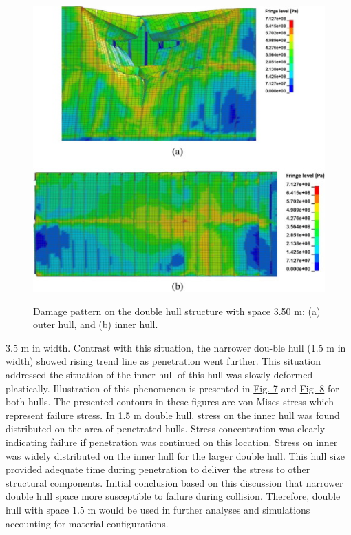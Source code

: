 \documentclass[../Final.tex]{subfiles}
\begin{document}
\begin{figure}[ht]
    \centering
    \includegraphics[width=\columnwidth]{fig8.jpg}
    \label{fig8}
    \caption{Damage pattern on the double hull structure with space 3.50 m: (a) outer hull, and (b) inner hull.}
\end{figure}

3.5 m in width. Contrast with this situation, the narrower dou-ble hull (1.5 m in width) showed rising trend line as penetration went further. 
This situation addressed the situation of the inner hull of this hull was slowly deformed plastically. Illustration of this phenomenon is presented in \hyperref[fig7]{Fig. 7} and \hyperref[fig8]{Fig. 8} for both hulls. 
The presented contours in these figures are von Mises stress which represent failure stress. In 1.5 m double hull, stress on the inner hull was found distributed on the area of penetrated hulls. 
Stress concentration was clearly indicating failure if pen­etration was continued on this location. 
Stress on inner was widely distributed on the inner hull for the larger double hull. This hull size provided adequate time during penetration to deliver the stress to other structural components. 
Initial conclusion based on this discussion that narrower double hull space more susceptible to failure during collision. 
Therefore, double hull with space 1.5 m would be used in further analyses and simulations accounting for material configurations. 
\end{document}
